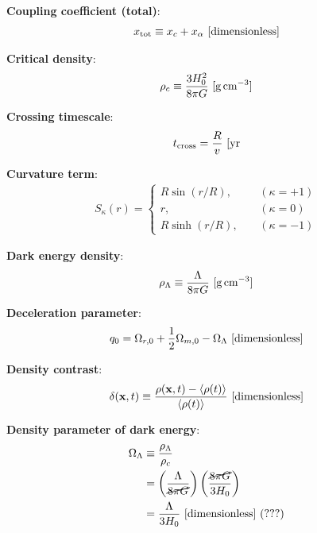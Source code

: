 \documentclass[a4paper,11pt]{article}
\begin{document}
{\noindent}\textbf{Coupling coefficient (total)}:
\begin{align*}
    x_\mathrm{tot} \equiv x_c + x_\alpha ~ [{\rm dimensionless}]
\end{align*}

{\noindent}\textbf{Critical density}:
\begin{align*}
    \rho_c \equiv \dfrac{3H_0^2}{8\pi G}  ~ [{\rm g\,cm^{-3}}]
\end{align*}

{\noindent}\textbf{Crossing timescale}:
\begin{align*}
    t_\mathrm{cross} = \frac{R}{v} ~ [{\rm yr}
\end{align*}

{\noindent}\textbf{Curvature term}:
\begin{align*}
S_\kappa(r) =
\left\{
\begin{aligned}
R\sin(r/R), ~~~~~& (\kappa = +1) \\
          r,~~~~~& (\kappa = 0) \\
R\sinh(r/R),~~~~~& (\kappa = -1)
\end{aligned}
\right.
\end{align*}

{\noindent}\textbf{Dark energy density}:
\begin{align*}
    \rho_\Lambda \equiv \dfrac{\Lambda}{8\pi G} ~ [{\rm g\,cm^{-3}}]
\end{align*}

{\noindent}\textbf{Deceleration parameter}:
\begin{align*}
    q_0 = \Omega_{r,0} + \frac{1}{2}\Omega_{m,0} - \Omega_\Lambda ~ [{\rm dimensionless}]
\end{align*}

{\noindent}\textbf{Density contrast}:
\begin{align*}
    \delta(\mathbf{x},t) \equiv \frac{\rho(\mathbf{x},t)-\langle\rho(t)\rangle}{\langle\rho(t)\rangle} ~ [{\rm dimensionless}]
\end{align*}

{\noindent}\textbf{Density parameter of dark energy}:
\begin{align*}
    \Omega_\Lambda &\equiv \dfrac{\rho_\Lambda}{\rho_c} \\
    &= \left(\dfrac{\Lambda}{\cancel{8\pi G}}\right) \left(\dfrac{\cancel{8\pi G}}{3H_0}\right) \\
    &= \dfrac{\Lambda}{3H_0} ~ [{\rm dimensionless}] ~ (???)
\end{align*}
\end{document}
